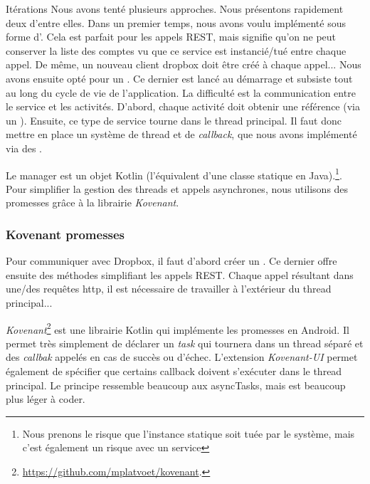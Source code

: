 \begin{notepar}{Itérations}
Nous avons tenté plusieurs approches. Nous présentons rapidement deux d'entre elles.
\newline\newline
Dans un premier temps, nous avons voulu implémenté  sous forme d'. Cela est parfait pour les appels REST, mais signifie qu'on ne peut conserver la liste des comptes vu que ce service est instancié/tué entre chaque appel. De même, un nouveau client dropbox doit être créé à chaque appel...
\newline\newline
Nous avons ensuite opté pour un . Ce dernier est lancé au démarrage et subsiste tout au long du cycle de vie de l'application. La difficulté est la communication entre le service et les activités. 
D'abord, chaque activité doit obtenir une référence (via un ). Ensuite, ce type de service tourne dans le thread principal. Il faut donc mettre en place un système de thread et de \emph{callback}, que nous avons implémenté via des . 
\end{notepar}

Le manager est un objet Kotlin (l'équivalent d'une classe statique en Java).\footnote{Nous prenons le risque que l'instance statique soit tuée par le système, mais c'est également un risque avec un service}. Pour simplifier la gestion des threads et appels asynchrones, nous utilisons des promesses grâce à la librairie \emph{Kovenant}.

\subsubsection*{Kovenant promesses}

Pour communiquer avec Dropbox, il faut d'abord créer un . Ce dernier offre ensuite des méthodes simplifiant les appels REST. Chaque appel résultant dans une/des requêtes http, il est nécessaire de travailler à l'extérieur du thread principal...

\emph{Kovenant}\footnote{\url{https://github.com/mplatvoet/kovenant}.} est une librairie Kotlin qui implémente les promesses en Android. Il permet très simplement de déclarer un \emph{task} qui tournera dans un thread séparé et des \emph{callbak} appelés en cas de succès ou d'échec. L'extension \emph{Kovenant-UI} permet également de spécifier que certains callback doivent s'exécuter dans le thread principal. Le principe ressemble beaucoup aux asyncTasks, mais est beaucoup plus léger à coder. 

